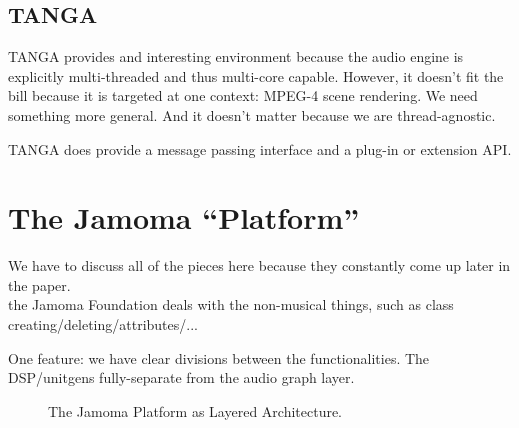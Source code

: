 \documentclass[twoside,10pt]{article}
\begin{document}

\subsection{TANGA} %

TANGA provides and interesting environment because the audio engine is explicitly multi-threaded and thus multi-core capable\cite{Reiter:2007}.  However, it doesn't fit the bill because it is targeted at one context: MPEG-4 scene rendering.  We need something more general.  And it doesn't matter because we are thread-agnostic.

TANGA does provide a message passing interface and a plug-in or extension API.



\section{The Jamoma ``Platform''} %

We have to discuss all of the pieces here because they constantly come up later in the paper.\\

the Jamoma Foundation deals with the non-musical things, such as class creating/deleting/attributes/...

One feature: we have clear divisions between the functionalities.   The DSP/unitgens fully-separate from the audio graph layer.


\begin{figure}[htbp]
\centerline{}
\caption{The Jamoma Platform as Layered Architecture.}
\label{fig:layers}
\end{figure}
\end{document}
